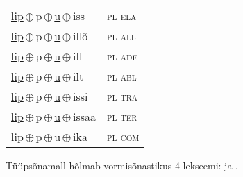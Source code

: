 \begin{minipage}{\textwidth}
\begin{sideways}
\begin{tabular}{l l}
\underline{lip}\,$\oplus$\,p\,$\oplus$\,\underline{u}\,$\oplus$\,iss & \textsc{ pl ela } \\
\underline{lip}\,$\oplus$\,p\,$\oplus$\,\underline{u}\,$\oplus$\,illõ & \textsc{ pl all } \\
\underline{lip}\,$\oplus$\,p\,$\oplus$\,\underline{u}\,$\oplus$\,ill & \textsc{ pl ade } \\
\underline{lip}\,$\oplus$\,p\,$\oplus$\,\underline{u}\,$\oplus$\,ilt & \textsc{ pl abl } \\
\underline{lip}\,$\oplus$\,p\,$\oplus$\,\underline{u}\,$\oplus$\,issi & \textsc{ pl tra } \\
\underline{lip}\,$\oplus$\,p\,$\oplus$\,\underline{u}\,$\oplus$\,issaa & \textsc{ pl ter } \\
\underline{lip}\,$\oplus$\,p\,$\oplus$\,\underline{u}\,$\oplus$\,ika & \textsc{ pl com } \\
\end{tabular}
\end{sideways}
\label{tab:tüüpsõnamall-lippu}

\end{minipage}

 
\vspace{1em}
\noindent Tüüpsõnamall  hõlmab vormisõnastikus 4 lekseemi:  ja .
